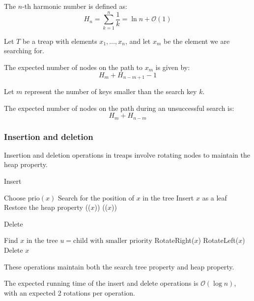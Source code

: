 \begin{definition}
    The $n$-th harmonic number is defined as:
    \[H_n=\sum_{k=1}^n\dfrac{1}{k}=\ln n + \mathcal{O}(1)\]    
\end{definition}
Let $T$ be a treap with elements $x_1, \dots, x_n$, and let $x_m$ be the element we are searching for.
\begin{lemma}
    The expected number of nodes on the path to $x_m$ is given by:
    \[H_{m}+H_{n-m+1}-1\]
\end{lemma}
Let $m$ represent the number of keys smaller than the search key $k$.
\begin{lemma}
    The expected number of nodes on the path during an unsuccessful search is:
    \[H_{m}+H_{n-m}\] 
\end{lemma}

\subsubsection{Insertion and deletion}
Insertion and deletion operations in treaps involve rotating nodes to maintain the heap property.
\begin{algorithm}[H]
    \caption{Insert}
    \begin{algorithmic}[1]
        \State Choose $\text{prio}(x)$
        \State Search for the position of $x$ in the tree
        \State Insert $x$ as a leaf
         \Comment Restore the heap property
                \State {}(($x$))
            \Else 
                \State {}(($x$))
            \EndIf
        \EndWhile
    \end{algorithmic}
\end{algorithm}
\begin{algorithm}[H]
    \caption{Delete}
    \begin{algorithmic}[1]
        \State Find $x$ in the tree
            \State $u = \text{child with smaller priority}$
                \State RotateRight($x$)
            \Else 
                \State RotateLeft($x$)
            \EndIf
        \EndWhile
        \State Delete $x$
    \end{algorithmic}
\end{algorithm}
These operations maintain both the search tree property and heap property.
\begin{lemma}
    The expected running time of the insert and delete operations is $\mathcal{O}(\log n)$, with an expected 2 rotations per operation.
\end{lemma}

